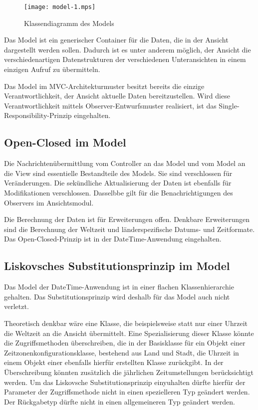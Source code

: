 \documentclass{vldb}
\begin{document}
\begin{figure}[h]
  \centering
  \texttt{[image: model-1.mps]}
  \caption{Klassendiagramm des Models}
  \label{modelmps}
\end{figure}

Das Model ist ein generischer Container für die Daten, die in der Ansicht dargestellt werden sollen. Dadurch ist es unter anderem möglich, der Ansicht die verschiedenartigen Datenstrukturen der verschiedenen Unteransichten in einem einzigen Aufruf zu übermitteln.

Das Model im MVC-Architekturmuster besitzt bereits die einzige Verantwortlichkeit, der Ansicht aktuelle Daten bereitzustellen. Wird diese Verantwortlichkeit mittels Observer-Entwurfsmuster realisiert, ist das Single-Responsibility-Prin\-zip eingehalten.

\subsection{Open-Closed im Model}
Die Nachrichtenübermittlung vom Controller an das Model und vom Model an die View sind essentielle Bestandteile des Models. Sie sind verschlossen für Veränderungen. Die sekündliche Aktualisierung der Daten ist ebenfalls für Modifikationen verschlossen. Dasselbbe gilt für die Benachrichtigungen des Observers im Ansichtsmodul.

Die Berechnung der Daten ist für Erweiterungen offen. Denkbare Erweiterungen sind die Berechnung der Weltzeit und länderspezifische Datums- und Zeitformate. Das Open-Closed-Prinzip ist in der DateTime-Anwendung eingehalten.

\subsection{Liskovsches Substitutionsprinzip im Model}
Das Model der DateTime-Anwendung ist in einer flachen Klassenhierarchie gehalten. Das Substitutionsprinzip wird deshalb für das Model auch nicht verletzt.

Theoretisch denkbar wäre eine Klasse, die beispielsweise statt nur einer Uhrzeit die Weltzeit an die Ansicht über\-mit\-telt. Eine Spezialisierung dieser Klasse könnte die Zugriffsmethoden überschreiben, die in der Basisklasse für ein Objekt einer Zeitzonenkonfigurationsklasse, bestehend aus Land und Stadt, die Uhrzeit in einem Objekt einer ebenfalls hierfür erstellten Klasse zurückgibt. In der Überschreibung könnten zusätzlich die jährlichen Zeitumstellungen be\-rück\-sich\-tigt werden.  Um das Liskovsche Substitutionsprinzip einyuhalten dürfte hierfür der Parameter der Zu\-griffs\-me\-tho\-de nicht in einen spezielleren Typ geändert werden. Der Rückgabetyp dürfte nicht in einen allgemeineren Typ ge\-än\-dert werden.
\end{document}
